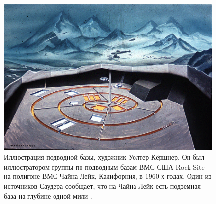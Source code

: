 \documentclass[10pt,twocolumn,letterpaper]{article}
\begin{document}
\begin{figure}[t]
\begin{center}
   \includegraphics[width=1\linewidth]{undersea.jpg}
\end{center}
   \caption{Иллюстрация подводной базы, художник Уолтер Кёршнер. Он был иллюстратором группы по подводным базам ВМС США Rock-Site на полигоне ВМС Чайна-Лейк, Калифорния, в 1960-х годах. Один из источников Саудера сообщает, что на Чайна-Лейк есть подземная база на глубине одной мили \cite{22,23}.}
\label{fig:5}
\label{fig:onecol}
\end{figure}
\end{document}
